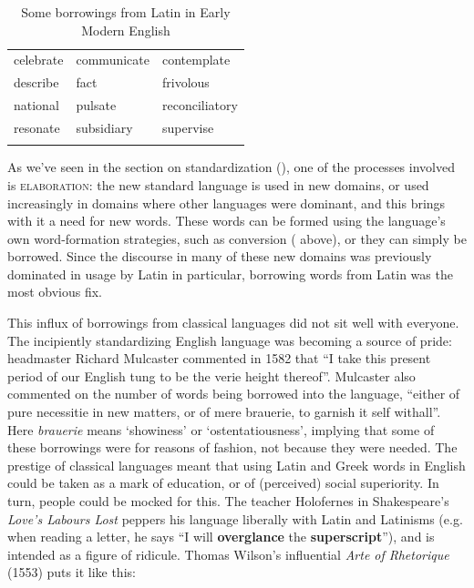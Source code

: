 \begin{table}
    \caption{Some borrowings from Latin in Early Modern English \citep[chapter 14]{Durkin2014}}\label{tab:EModE-borrowings}
  \begin{tabularx}{.8\textwidth}{XXl}
    \lsptoprule
    celebrate & communicate & contemplate \\
    describe & fact & frivolous \\
    national & pulsate & reconciliatory\\
    resonate & subsidiary & supervise\\
    \lspbottomrule
  \end{tabularx}
\end{table}

As we've seen in the section on standardization (), one of the processes involved is \textsc{elaboration}: the new standard language is used in new domains, or used increasingly in domains where other languages were dominant, and this brings with it a need for new words. These words can be formed using the language's own word-formation strategies, such as conversion ( above), or they can simply be borrowed. Since the discourse in many of these new domains was previously dominated in usage by Latin in particular, borrowing words from Latin was the most obvious fix.

This influx of borrowings from classical languages did not sit well with everyone. The incipiently standardizing English language was becoming a source of pride: headmaster Richard Mulcaster commented in 1582 that ``I take this present period of our English tung to be the verie height thereof''. Mulcaster also commented on the number of words being borrowed into the language, ``either of pure necessitie in new matters, or of mere brauerie, to garnish it self withall''. Here \textit{brauerie} means `showiness' or `ostentatiousness', implying that some of these borrowings were for reasons of fashion, not because they were needed. The prestige of classical languages meant that using Latin and Greek words in English could be taken as a mark of education, or of (perceived) social superiority. In turn, people could be mocked for this. The teacher Holofernes in Shakespeare's \textit{Love's Labours Lost} peppers his language liberally with Latin and Latinisms (e.g. when reading a letter, he says ``I will \textbf{overglance} the \textbf{superscript}''), and is intended as a figure of ridicule. Thomas Wilson's influential \textit{Arte of Rhetorique} (1553) puts it like this:

